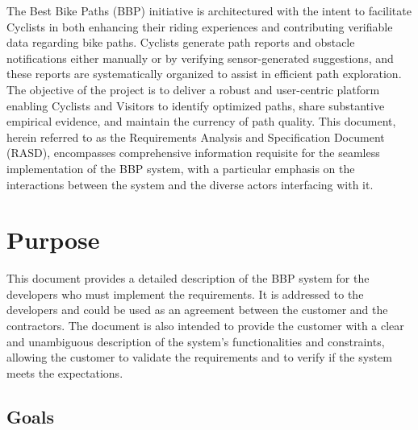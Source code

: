 The Best Bike Paths (BBP) initiative is architectured with the intent to facilitate Cyclists in both enhancing their riding experiences and contributing verifiable data regarding bike paths. Cyclists generate path reports and obstacle notifications either manually or by verifying sensor-generated suggestions, and these reports are systematically organized to assist in efficient path exploration. The objective of the project is to deliver a robust and user-centric platform enabling Cyclists and Visitors to identify optimized paths, share substantive empirical evidence, and maintain the currency of path quality. This document, herein referred to as the Requirements Analysis and Specification Document (RASD), encompasses comprehensive information requisite for the seamless implementation of the BBP system, with a particular emphasis on the interactions between the system and the diverse actors interfacing with it.

\newpage

\section{Purpose}
This document provides a detailed description of the BBP system for the developers who must implement the requirements. It is addressed to the developers and could be used as an agreement between the customer and the contractors.
The document is also intended to provide the customer with a clear and unambiguous description of the system's functionalities and constraints, allowing the customer to validate the requirements and to verify if the system meets the expectations.

\subsection{Goals}
\label{subsec:goals}%
\setcounter{g}{1}
\newcommand{\cg}{\theg\stepcounter{g}}

